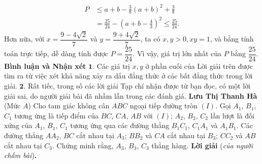 \begin{multicols}{2}
\begin{align*}
		P &\le a + b - \frac{3}{8}{\left( {a + b} \right)^2} + \frac{3}{8}\\
		 &= \frac{{25}}{{24}} - {\left( {a + b - \frac{4}{3}} \right)^2} \le \frac{{25}}{{24}}.
	\end{align*}
	Hơn nữa, với  $x = \dfrac{{9 - 4\sqrt 2 }}{7}$ và  $y = \dfrac{{9 + 4\sqrt 2 }}{7}$, ta có $x, y > 0, xy = 1$, và bằng tính toán trực tiếp, dễ dàng tính được  $P = \dfrac{25}{24}$.
	\vskip 0.05cm
	Vì vậy, giá trị lớn nhất của $P$ bằng  $\dfrac{25}{24}$.
	\vskip 0.05cm
	\textbf{\color{thachthuctoanhoc}Bình luận và Nhận xét}
	\vskip 0.05cm
	$\pmb{1.}$ Các giá trị $x, y$ ở phần cuối của Lời giải trên được tìm ra từ việc xét khả năng xảy ra dấu đẳng thức ở các bất đẳng thức trong lời giải.
	\vskip 0.05cm
	$\pmb{2.}$ Rất tiếc, trong số các lời giải Tạp chí nhận được từ bạn đọc, có một lời giải sai, do người giải bài đã nhầm lẫn trong các đánh giá.
	\vskip 0.05cm
	\hfill\textbf{\color{thachthuctoanhoc}Lưu Thị Thanh Hà}
	\vskip 0.05cm
	{}
	(Mức $A$) Cho tam giác không cân $ABC$ ngoại tiếp đường tròn $(I)$. Gọi $A_1$, $B_1$, $C_1$ tương ứng là tiếp điểm của $BC$, $CA$, $AB$ với $(I)$; $A_2$, $B_2$, $C_2$ lần lượt là đối xứng của $A_1$, $B_1$, $C_1$ tương ứng qua các đường thẳng $B_1C_1$, $C_1A_1$ và $A_1B_1$. Các đường thẳng $AA_2$, $BC$ cắt nhau tại $A_3$; $BB_2$ và $CA$ cắt nhau tại $B_3$; $CC_2$ và $AB$ cắt nhau tại $C_3$. Chứng minh rằng, $A_3$, $B_3$, $C_3$ thẳng hàng.
	\vskip 0.05cm
	\textbf{\color{thachthuctoanhoc}Lời giải} (\textit{của người chấm bài})\textbf{\color{thachthuctoanhoc}.}
	\begin{figure}[H]
		\centering
		\vspace*{-10pt}
		\captionsetup{labelformat= empty, justification=centering}

\end{figure}
\end{multicols}
